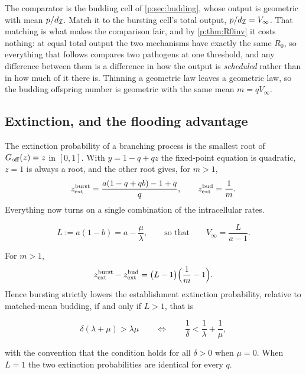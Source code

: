The comparator is the budding cell of \cref{p:sec:budding}, whose output is
geometric with mean $p/d_{\mathcal{I}}$. Match it to the bursting cell's total
output, $p/d_{\mathcal{I}}=V_\infty$. That matching is what makes the comparison
fair, and by \cref{p:thm:R0inv} it costs nothing: at equal total output the
two mechanisms have exactly the same $R_0$, so everything that follows
compares two pathogens at one threshold, and any difference between them is
a difference in how the output is \emph{scheduled} rather than in how much of
it there is. Thinning a geometric law leaves a geometric law, so the budding
offspring number is geometric with the same mean $m=qV_\infty$.

\subsection{Extinction, and the flooding advantage}

The extinction probability of a branching process is the smallest root of
$G_{\rm off}(z)=z$ in $[0,1]$. With $y=1-q+qz$ the fixed-point equation is
quadratic, $z=1$ is always a root, and the other root gives, for $m>1$,
\begin{equation}
z_{\rm ext}^{\rm burst}
=\frac{a(1-q+qb)-1+q}{q},
\qquad
z_{\rm ext}^{\rm bud}=\frac{1}{m}.
\label{p:eq:zext}
\end{equation}
Everything now turns on a single combination of the intracellular rates.

\begin{definition}
\label{p:def:L}
\begin{equation}
L:=a(1-b)=a-\frac{\mu}{\lambda},
\qquad\text{so that}\qquad
V_\infty=\frac{L}{a-1}.
\label{p:eq:Ldef}
\end{equation}
\end{definition}

\begin{theorem}
\label{p:thm:flood}
For $m>1$,
\begin{equation}
z_{\rm ext}^{\rm burst}-z_{\rm ext}^{\rm bud}
=\bigl(L-1\bigr)\Bigl(\frac{1}{m}-1\Bigr).
\label{p:eq:flood}
\end{equation}
Hence bursting strictly lowers the establishment extinction probability,
relative to matched-mean budding, if and only if $L>1$, that is
\begin{keyresult}
\begin{equation}
\delta(\lambda+\mu)>\lambda\mu
\qquad\Longleftrightarrow\qquad
\frac{1}{\delta}<\frac{1}{\lambda}+\frac{1}{\mu},
\label{p:eq:floodcrit}
\end{equation}
\end{keyresult}
with the convention that the condition holds for all $\delta>0$ when
$\mu=0$. When $L=1$ the two extinction probabilities are identical for every
$q$.
\end{theorem}

